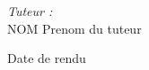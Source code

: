 \begin{titlepage}
\begin{minipage}{0.87\textwidth}
\begin{flushright}

\textit{Tuteur :}\\[0.2cm]

NOM Prenom du tuteur

\end{flushright}

\end{minipage}


\vfill

\begin{center}

Date de rendu

\end{center}

\end{titlepage}

\clearpage